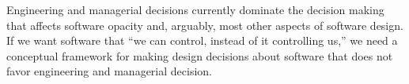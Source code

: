 Engineering and managerial decisions currently dominate
the decision making that affects software opacity and, arguably, most other aspects of
software design. If we want software that ``we can control, instead of it controlling
us,''
we need a conceptual framework for making design decisions about software that does
not favor engineering and managerial decision.



